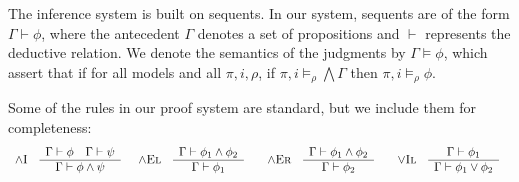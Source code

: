 The inference system is built on sequents. In our system, sequents are of the form $\Gamma \vdash \phi$, where the antecedent $\Gamma$ denotes a set of propositions and $\vdash$ represents the deductive relation. We denote the semantics of the judgments by $\Gamma \models \phi$, which assert that if
for all models and all $\pi,i,\rho$, if $\pi,i\models_\rho \bigwedge\Gamma$ then $\pi,i\models_\rho \phi$.

Some of the rules in our proof system are standard, but we include them for completeness:
\[
\begin{array}{ccccc}
\mbox{\sc $\wedge$I}
&
\begin{array}{c}
 \Gamma \vdash \phi \hspace*{1em}  \Gamma \vdash \psi \\ \hline
 \Gamma\vdash \phi\wedge\psi
\end{array}
&
\begin{array}{cc}
\mbox{\sc $\wedge$El}
&
\begin{array}{c}
 \Gamma \vdash \phi_1 \wedge \phi_2 \\ \hline
 \Gamma \vdash \phi_1
\end{array}
\end{array} 
&
\begin{array}{cc}
\mbox{\sc $\wedge$Er}
&
\begin{array}{c}
 \Gamma \vdash \phi_1 \wedge \phi_2 \\ \hline
 \Gamma \vdash \phi_2
\end{array}
\end{array}
&
\begin{array}{cc}
\mbox{\sc $\vee$Il}
&
\begin{array}{c}
 \Gamma \vdash \phi_1\\ \hline
 \Gamma \vdash \phi_1  \vee \phi_2 
\end{array}
\end{array}
\end{array}
\]
